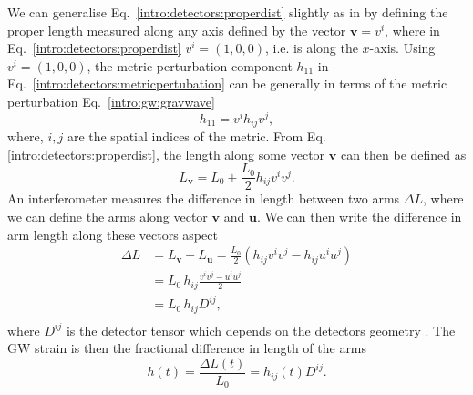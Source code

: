 We can generalise Eq.~\ref{intro:detectors:properdist} slightly as in \citep{whelanGeometryGravitational} by defining the proper length measured along any axis defined by the vector $\bm{v} = v^i$, where in Eq.~\ref{intro:detectors:properdist} $v^i = (1,0,0)$, i.e. is along the $x$-axis.
Using $v^i = (1,0,0)$, the metric perturbation component $h_{11}$ in Eq.~\ref{intro:detectors:metricpertubation} can be generally in terms of the metric perturbation Eq.~\ref{intro:gw:gravwave} 
\begin{equation}
    h_{11} = v^i h_{ij} v^j,
\end{equation}
where, $i,j$ are the spatial indices of the metric.
From Eq.\ref{intro:detectors:properdist}, the length along some vector $\bm{v}$ can then be defined as 
\begin{equation}
    L_{\bm{v}} = L_0 + \frac{L_0}{2} h_{ij} v^i v^j.
\end{equation}
An interferometer measures the difference in length between two arms $\Delta L$, where we can define the arms along vector $\bm{v}$ and $\bm{u}$.
We can then write the difference in arm length along these vectors aspect
\begin{equation}
    \label{intro:detector:lengthdifference}
    \begin{split}
        \Delta L &= L_{\bm{v}} - L_{\bm{u}} = \frac{L_0}{2} \left( h_{ij} v^i v^j - h_{ij}u^i u^j \right) \\
                &= L_0\, h_{ij} \frac{ v^i v^j - u^i u^j }{2}\\
                &= L_0\, h_{ij} D^{ij},\\
    \end{split}
\end{equation}
where $D^{ij}$ is the detector tensor which depends on the detectors geometry \citep{whelanGeometryGravitational}.
The \gls{GW} strain is then the fractional difference in length of the arms
\begin{equation} 
    \label{intro:detectors:strain:detectortensor}
    h(t) = \frac{\Delta L(t)}{ L_0} = h_{ij}(t) D^{ij}.
\end{equation}

